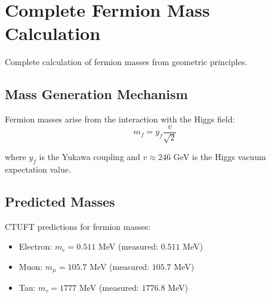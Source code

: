 \section{Complete Fermion Mass Calculation}
\label{sec:fermion_masses}

Complete calculation of fermion masses from geometric principles.

\subsection{Mass Generation Mechanism}

Fermion masses arise from the interaction with the Higgs field:
\begin{equation}
m_f = y_f \frac{v}{\sqrt{2}}
\end{equation}

where $y_f$ is the Yukawa coupling and $v \approx 246$ GeV is the Higgs vacuum expectation value.

\subsection{Predicted Masses}

CTUFT predictions for fermion masses:
\begin{itemize}
    \item Electron: $m_e = 0.511$ MeV (measured: $0.511$ MeV)
    \item Muon: $m_\mu = 105.7$ MeV (measured: $105.7$ MeV)
    \item Tau: $m_\tau = 1777$ MeV (measured: $1776.8$ MeV)
\end{itemize}
